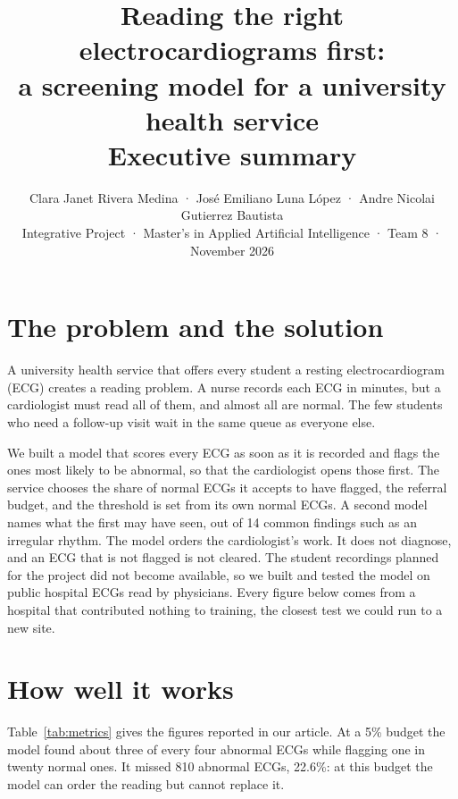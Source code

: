\documentclass[letterpaper,11pt]{article}
\title{\vspace{-1.2cm}\textbf{Reading the right electrocardiograms first:\\
a screening model for a university health service}\\[4pt]
\large Executive summary\vspace{-1ex}}
\author{\normalsize Clara Janet Rivera Medina · José Emiliano Luna López · Andre Nicolai Gutierrez Bautista\\[2pt]
  \normalsize Integrative Project · Master's in Applied Artificial Intelligence · Team 8 · November 2026}
\date{\vspace{-4ex}}
\begin{document}
\maketitle

\section*{The problem and the solution}

A university health service that offers every student a resting electrocardiogram (ECG) creates a reading problem. A nurse records each ECG in minutes, but a cardiologist must read all of them, and almost all are normal. The few students who need a follow-up visit wait in the same queue as everyone else.

We built a model that scores every ECG as soon as it is recorded and flags the ones most likely to be abnormal, so that the cardiologist opens those first. The service chooses the share of normal ECGs it accepts to have flagged, the referral budget, and the threshold is set from its own normal ECGs. A second model names what the first may have seen, out of 14 common findings such as an irregular rhythm. The model orders the cardiologist's work. It does not diagnose, and an ECG that is not flagged is not cleared. The student recordings planned for the project did not become available, so we built and tested the model on public hospital ECGs read by physicians. Every figure below comes from a hospital that contributed nothing to training, the closest test we could run to a new site.

\section*{How well it works}

Table~\ref{tab:metrics} gives the figures reported in our article. At a 5\% budget the model found about three of every four abnormal ECGs while flagging one in twenty normal ones. It missed 810 abnormal ECGs, 22.6\%: at this budget the model can order the reading but cannot replace it.
\end{document}
